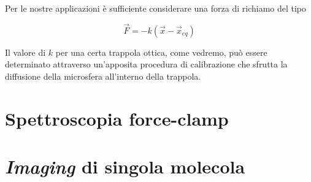 Per le nostre applicazioni è sufficiente considerare una forza di richiamo del tipo 

\begin{equation}
    \vec{F} = -k(\vec{x}-\vec{x}_{eq})
\end{equation}

Il valore di $k$ per una certa trappola ottica, come vedremo, può essere
determinato attraverso un'apposita procedura di calibrazione che sfrutta
la diffusione della microsfera all'interno della trappola.





\section{Spettroscopia force-clamp}

\section{\textit{Imaging} di singola molecola}